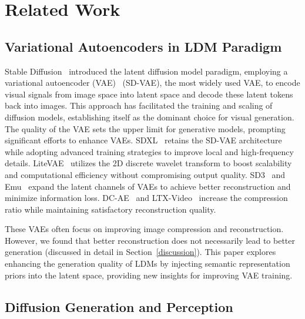\section{Related Work}
\subsection{Variational Autoencoders in LDM Paradigm} 
Stable Diffusion~\cite{rombach2022ldm} introduced the latent diffusion model paradigm, employing a variational autoencoder (VAE)~\cite{kingma2013vae} (SD-VAE), the most widely used VAE, to encode visual signals from image space into latent space and decode these latent tokens back into images. This approach has facilitated the training and scaling of diffusion models, establishing itself as the dominant choice for visual generation. The quality of the VAE sets the upper limit for generative models, prompting significant efforts to enhance VAEs. SDXL~\cite{podell2023sdxl} retains the SD-VAE architecture while adopting advanced training strategies to improve local and high-frequency details. LiteVAE~\cite{sadat2024litevae} utilizes the 2D discrete wavelet transform to boost scalability and computational efficiency without compromising output quality. SD3~\cite{esser2024sd3} and Emu~\cite{dai2023emu} expand the latent channels of VAEs to achieve better reconstruction and minimize information loss. DC-AE~\cite{chen2024dcae} and LTX-Video~\cite{hacohen2024ltxvideo} increase the compression ratio while maintaining satisfactory reconstruction quality. 

These VAEs often focus on improving image compression and reconstruction. However, we found that better reconstruction does not necessarily lead to better generation (discussed in detail in Section~\ref{discussion}). This paper explores enhancing the generation quality of LDMs by injecting semantic representation priors into the latent space, providing new insights for improving VAE training.



\subsection{Diffusion Generation and Perception} 


